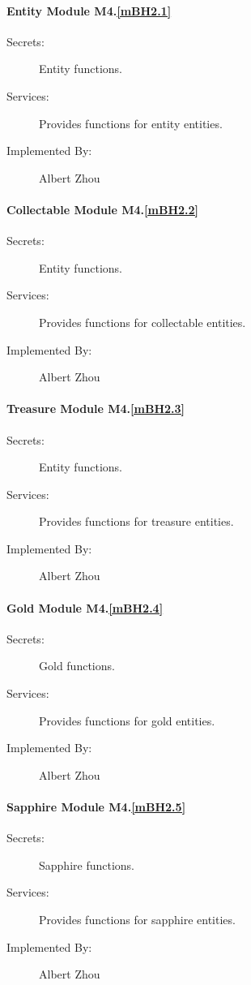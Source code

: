 \documentclass[12pt, titlepage]{article}
\begin{document}
{\color{red}
\paragraph{Entity Module M4.\ref{mBH2.1}}
\begin{description}
\item[Secrets:] Entity functions.
\item[Services:] Provides functions for entity entities. 
\item[Implemented By:] Albert Zhou
\end{description}

\paragraph{Collectable Module M4.\ref{mBH2.2}}
\begin{description}
\item[Secrets:] Entity functions.
\item[Services:] Provides functions for collectable entities. 
\item[Implemented By:] Albert Zhou
\end{description}

\paragraph{Treasure Module M4.\ref{mBH2.3}}
\begin{description}
\item[Secrets:] Entity functions.
\item[Services:] Provides functions for treasure entities. 
\item[Implemented By:] Albert Zhou
\end{description}

\paragraph{Gold Module M4.\ref{mBH2.4}}
\begin{description}
\item[Secrets:] Gold functions.
\item[Services:] Provides functions for gold entities. 
\item[Implemented By:] Albert Zhou
\end{description}

\paragraph{Sapphire Module M4.\ref{mBH2.5}}
\begin{description}
\item[Secrets:] Sapphire functions.
\item[Services:] Provides functions for sapphire entities. 
\item[Implemented By:] Albert Zhou
\end{description}

}
\end{document}
